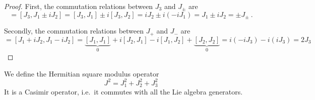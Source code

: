     \begin{proof}
        First, the commutation relations between $J_3$ and $J_\pm$ are 
        \begin{equation*}
            [J_3, J_\pm] = [J_3, J_1 \pm i J_2] = [J_3, J_1] \pm i [J_3, J_2] = i J_2 \pm i (- i J_1) = J_1 \pm i J_2 = \pm J_\pm ~.
        \end{equation*}

        Secondly, the commutation relations between $J_+$ and $J_-$ are 
        \begin{equation*}
            [J_+, J_-] = [J_1 + i J_2, J_1 - i J_2] = \underbrace{[J_1, J_1]}_0 + i [J_2, J_1] - i [J_1, J_2] + \underbrace{[J_2, J_2]}_0 = i (-i J_3) - i (i J_3) = 2 J_3
        \end{equation*}
    \end{proof}
    
    We define the Hermitian square modulus operator 
    \begin{equation*}
        J^2 = J_1^2 + J_2^2 + J_3^2
    \end{equation*}
    It is a Casimir operator, i.e.~it commutes with all the Lie algebra generators.

